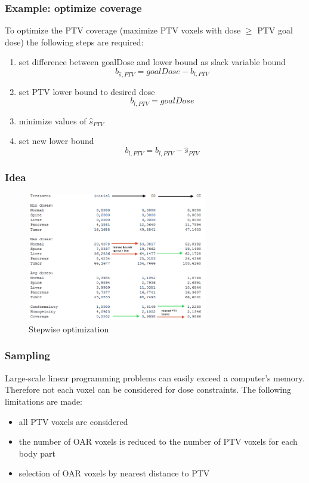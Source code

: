 \documentclass{beamer}
\begin{document}
	\begin{frame}
	\frametitle{Example: optimize coverage}
		To optimize the PTV coverage (maximize PTV voxels with dose $\geq$ PTV goal dose) the following steps are required:
		
		\begin{enumerate}
		\item set difference between goalDose and lower bound
				as slack variable bound
					\begin{equation}
						b_{\hat{s},PTV} = goalDose - b_{l,PTV}
					\end{equation}
		\item set PTV lower bound to desired dose
			\begin{equation}
				b_{l,PTV} = goalDose
			\end{equation}
		\item minimize values of $\hat{s}_{PTV}$
		\item set new lower bound
			\begin{equation}
			b_{l,PTV} = b_{l,PTV} - \hat{s}_{PTV}
			\end{equation}
		\end{enumerate}

	\end{frame}	
	
	\begin{frame}
	\frametitle{Idea}
		\begin{figure}[h]
		\centering
		\includegraphics[width=0.7\textwidth]{pictures/stepwise}
		\caption{Stepwise optimization}
		\end{figure}
	\end{frame}	
	
	\begin{frame}
	\frametitle{Sampling}
		Large-scale linear programming problems can easily exceed a computer's memory.
		Therefore not each voxel can be considered for dose constraints. The following limitations are made:
		\begin{itemize}
			\item all PTV voxels are considered
			\item the number of OAR voxels is reduced to the number of PTV voxels for each body part
			\item selection of OAR voxels by nearest distance to PTV
		\end{itemize}
	\end{frame}	
	
\end{document}
